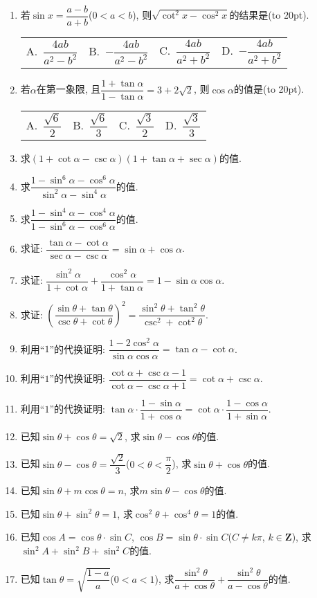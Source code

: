 \documentclass[10pt,a4paper]{article}
\newcommand{\bracket}[1]{(\hbox to #1pt{})}
\newcommand{\fourch}[4]{\par\begin{tabular}{p{.23\textwidth}p{.23\textwidth}p{.23\textwidth}p{.23\textwidth}}
A.~#1 &B.~#2& C.~#3& D.~#4
\end{tabular}}
\begin{document}
\begin{enumerate}[1.]
\item 若$\sin x=\dfrac{a-b}{a+b}$($0<a<b$), 则$\sqrt {\cot ^2x-\cos ^2x}$的结果是\bracket{20}.
\fourch{$\dfrac{4ab}{a^2-b^2}$}{$-\dfrac{4ab}{a^2-b^2}$}{$\dfrac{4ab}{a^2+b^2}$}{$-\dfrac{4ab}{a^2+b^2}$}
\item 若$\alpha$在第一象限, 且$\dfrac{1+\tan \alpha}{1-\tan \alpha}=3+2\sqrt 2$, 则$\cos \alpha$的值是\bracket{20}.
\fourch{$\dfrac{\sqrt 6}2$}{$\dfrac{\sqrt 6}3$}{$\dfrac{\sqrt 3}2$}{$\dfrac{\sqrt 3}3$}
\item 求$(1+\cot \alpha -\csc \alpha)(1+\tan \alpha +\sec \alpha)$的值.
\item 求$\dfrac{1-\sin ^6\alpha -\cos ^6\alpha}{\sin ^2\alpha -\sin ^4\alpha}$的值.
\item 求$\dfrac{1-\sin ^4\alpha -\cos ^4\alpha}{1-\sin ^6\alpha -\cos ^6\alpha}$的值.
\item 求证: $\dfrac{\tan \alpha -\cot \alpha}{\sec \alpha -\csc \alpha}=\sin \alpha +\cos \alpha$.
\item 求证: $\dfrac{\sin ^2\alpha}{1+\cot \alpha}+\dfrac{\cos ^2\alpha}{1+\tan \alpha}=1-\sin \alpha \cos \alpha$.
\item 求证: $(\dfrac{\sin \theta +\tan \theta}{\csc \theta +\cot \theta})^2=\dfrac{\sin ^2\theta +\tan ^2\theta}{\csc ^2+\cot ^2\theta}$.
\item 利用``$1$''的代换证明: $\dfrac{1-2\cos ^2\alpha}{\sin \alpha \cos \alpha}=\tan \alpha -\cot \alpha$.
\item 利用``$1$''的代换证明: $\dfrac{\cot \alpha +\csc \alpha -1}{\cot \alpha -\csc \alpha +1}=\cot \alpha +\csc \alpha$.
\item 利用``$1$''的代换证明: $\tan \alpha \cdot \dfrac{1-\sin \alpha}{1+\cos \alpha}=\cot \alpha \cdot \dfrac{1-\cos \alpha}{1+\sin \alpha}$.
\item 已知$\sin \theta +\cos \theta =\sqrt 2$, 求$\sin \theta -\cos \theta$的值.
\item 已知$\sin \theta -\cos \theta =\dfrac{\sqrt 2}3$($0<\theta <\dfrac{\pi}2$), 求$\sin \theta +\cos \theta$的值.
\item 已知$\sin \theta +m\cos \theta =n$, 求$m\sin \theta -\cos \theta$的值.
\item 已知$\sin \theta +\sin ^2\theta =1$, 求$\cos ^2\theta +\cos ^4\theta =1$的值.
\item 已知$\cos A=\cos \theta \cdot \sin C$, $\cos B=\sin \theta \cdot \sin C$($C\ne k\pi$, $k\in \mathbf{Z}$), 求$\sin ^2A+\sin ^2B+\sin ^2C$的值.
\item 已知$\tan \theta =\sqrt {\dfrac{1-a}a}$($0<a<1$), 求$\dfrac{\sin ^2\theta}{a+\cos \theta}+\dfrac{\sin ^2\theta}{a-\cos \theta}$的值.

\end{enumerate}
\end{document}
